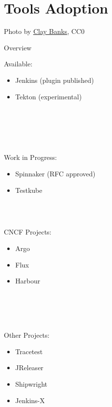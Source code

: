\documentclass[aspectratio=169,11pt,hyperref={colorlinks=true}]{beamer}
\begin{document}
\section{Tools Adoption}
\begin{sectionwithpiclargecentral}{Photo by \href{https://unsplash.com/@claybanks}{\underline{Clay Banks}}, CC0}
\end{sectionwithpiclargecentral}

\begin{3squares}{Overview}{%
    Available:
    \begin{itemize}
      \item Jenkins (plugin published)
      \item Tekton (experimental)
    \end{itemize}
    ~ \\
    ~ \\
    ~ \\
    ~ \\
  }{%
    Work in Progress:
    \begin{itemize}
      \item Spinnaker (RFC approved)
      \item Testkube
    \end{itemize}
    ~ \\
    ~ \\
  }{%
    CNCF Projects:
    \begin{itemize}
      \item Argo
      \item Flux
      \item Harbour
    \end{itemize}
    ~ \\
    ~ \\
    ~ \\
    ~ \\
    Other Projects:
    \begin{itemize}
      \item Tracetest
      \item JReleaser
      \item Shipwright
      \item Jenkins-X
    \end{itemize}
  }
\end{3squares}
\end{document}
